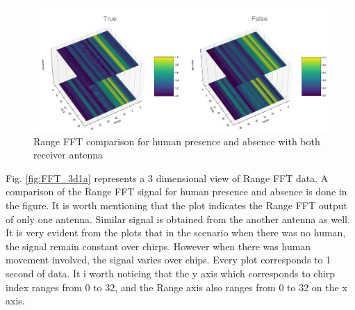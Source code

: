 \begin{figure}[ht]
  \begin{center}
    \includegraphics[width=1\textwidth]{Master's thesis/images/4d_fft.PNG} 
    \caption{Range FFT comparison for human presence and absence with both receiver antenna}
    \label{fig:FFT_4d2a}
  \end{center}
\end{figure} 
Fig. \ref{fig:FFT_3d1a} represents a 3 dimensional view of Range FFT data. A comparison of the Range FFT signal for human presence and absence is done in the figure. It is worth mentioning that the plot indicates the Range FFT output of only one antenna. Similar signal is obtained from the another antenna as well. 
It is very evident from the plots that in the scenario when there was no human, the signal remain constant over chirps. However when there was human movement involved, the signal varies over chips. Every plot corresponds to 1 second of data. It i worth noticing that the y axis which corresponds to chirp index ranges from 0 to 32, and the Range axis also ranges from 0 to 32 on the x axis.
  
